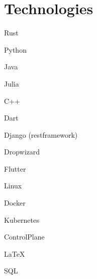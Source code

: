 \documentclass[hidelinks]{scrartcl}
\begin{document}





\section{Technologies}
{
    \item[] Rust
    \item Python 
    \item Java
    \item Julia
    \item C++
    \item Dart
}

{
    \item[] Django (restframework)
    \item Dropwizard
    \item Flutter
}

{
    \item[] Linux
    \item Docker
    \item Kubernetes
    \item ControlPlane
    \item \LaTeX
    \item SQL
}

\vfill
{\color{mycolor}\titlerule}
\end{document}
